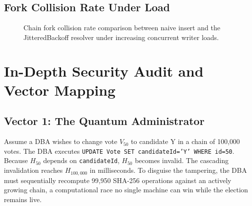 \documentclass[journal,10pt,twocolumn]{IEEEtran}
\begin{document}
\subsection{Fork Collision Rate Under Load}

\begin{figure}[htbp]
\centering
{}
\caption{Chain fork collision rate comparison between naive insert and the JitteredBackoff resolver under increasing concurrent writer loads.}
\label{fig:fork_rate}
\end{figure}

\section{In-Depth Security Audit and Vector Mapping}

\subsection{Vector 1: The Quantum Administrator}

Assume a DBA wishes to change vote $V_{50}$ to candidate Y in a chain of 100,000 votes. The DBA executes \texttt{UPDATE Vote SET candidateId='Y' WHERE id=50}. Because $H_{50}$ depends on \texttt{candidateId}, $H_{50}$ becomes invalid. The cascading invalidation reaches $H_{100,000}$ in milliseconds. To disguise the tampering, the DBA must sequentially recompute 99,950 SHA-256 operations against an actively growing chain, a computational race no single machine can win while the election remains live.
\end{document}

